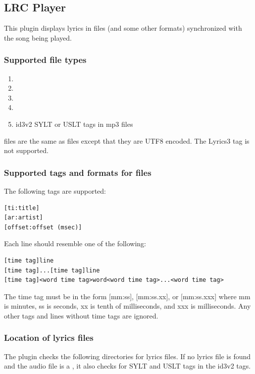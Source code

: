 \subsection{LRC Player}
This plugin displays lyrics in  files (and some other formats)
synchronized with the song being played.

\subsubsection{Supported file types}
\begin{enumerate}
\item {}
\item {}
\item {}
\item {}
\item id3v2 SYLT or USLT tags in mp3 files
\end{enumerate}

 files are the same as  files except that they are UTF8
encoded. The Lyrics3 tag is not supported.

\subsubsection{Supported tags and formats for  files}
The following tags are supported:
\begin{verbatim}
[ti:title]
[ar:artist]
[offset:offset (msec)]
\end{verbatim}

Each line should resemble one of the following:
\begin{verbatim}
[time tag]line
[time tag]...[time tag]line
[time tag]<word time tag>word<word time tag>...<word time tag>
\end{verbatim}

The time tag must be in the form [mm:ss], [mm:ss.xx], or [mm:ss.xxx] where mm is
minutes, ss is seconds, xx is tenth of milliseconds, and xxx is milliseconds.
Any other tags and lines without time tags are ignored.

\subsubsection{Location of lyrics files}
The plugin checks the following directories for lyrics files.
If no lyrics file is found and the audio file is a ,
it also checks for SYLT and USLT tags in the id3v2 tags.


